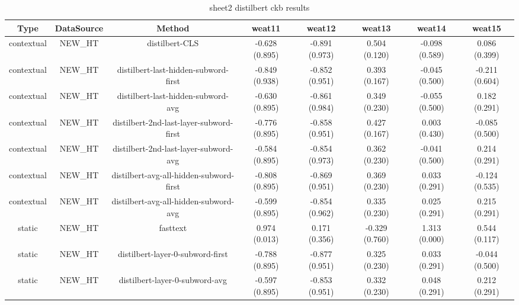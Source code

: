 \begin{sidewaystable}[htb]
    \centering
    \caption{sheet2 distilbert ckb results}
    \label{appendix_tab:sheet2_distilbert_ckb_results}
    \small
    \begin{tabular}{@{}cccccccc@{}}
        \toprule
        Type & DataSource & Method & weat11 & weat12 & weat13 & weat14 & weat15 \\
        \midrule
        contextual & NEW\_HT & distilbert-CLS & -0.628 (0.895) & -0.891 (0.973) & 0.504 (0.120) & -0.098 (0.589) & 0.086 (0.399) \\
        contextual & NEW\_HT & distilbert-last-hidden-subword-first & -0.849 (0.938) & -0.852 (0.951) & 0.393 (0.167) & -0.045 (0.500) & -0.211 (0.604) \\
        contextual & NEW\_HT & distilbert-last-hidden-subword-avg & -0.630 (0.895) & -0.861 (0.984) & 0.349 (0.230) & -0.055 (0.500) & 0.182 (0.291) \\
        contextual & NEW\_HT & distilbert-2nd-last-layer-subword-first & -0.776 (0.895) & -0.858 (0.951) & 0.427 (0.167) & 0.003 (0.430) & -0.085 (0.500) \\
        contextual & NEW\_HT & distilbert-2nd-last-layer-subword-avg & -0.584 (0.895) & -0.854 (0.973) & 0.362 (0.230) & -0.041 (0.500) & 0.214 (0.291) \\
        contextual & NEW\_HT & distilbert-avg-all-hidden-subword-first & -0.808 (0.895) & -0.869 (0.951) & 0.369 (0.230) & 0.033 (0.291) & -0.124 (0.535) \\
        contextual & NEW\_HT & distilbert-avg-all-hidden-subword-avg & -0.599 (0.895) & -0.854 (0.962) & 0.335 (0.230) & 0.025 (0.291) & 0.215 (0.291) \\
        static & NEW\_HT & fasttext & 0.974 (0.013) & 0.171 (0.356) & -0.329 (0.760) & 1.313 (0.000) & 0.544 (0.117) \\
        static & NEW\_HT & distilbert-layer-0-subword-first & -0.788 (0.895) & -0.877 (0.951) & 0.325 (0.230) & 0.033 (0.291) & -0.044 (0.500) \\
        static & NEW\_HT & distilbert-layer-0-subword-avg & -0.597 (0.895) & -0.853 (0.951) & 0.332 (0.230) & 0.048 (0.291) & 0.212 (0.291) \\
        \bottomrule
    \end{tabular}
\end{sidewaystable}
